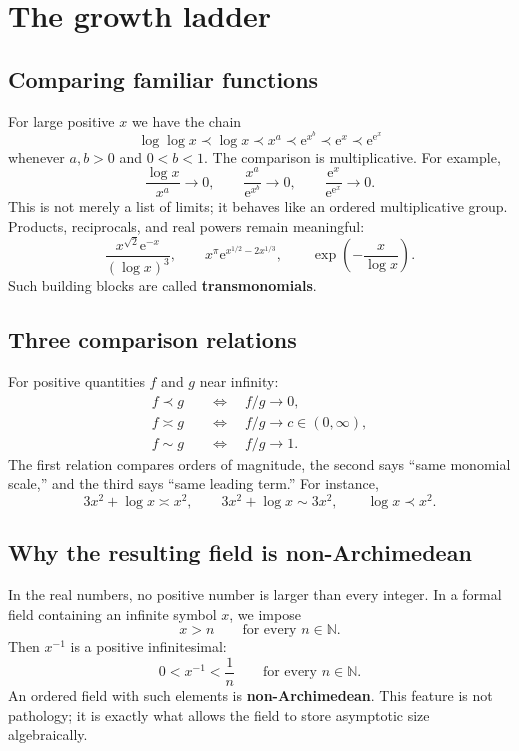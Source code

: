 \documentclass[11pt,openany]{book}
\theoremstyle{plain}
\theoremstyle{definition}
\theoremstyle{remark}
\newcommand{\N}{\mathbb{N}}
\newcommand{\e}{\mathrm{e}}
\newcommand{\defterm}[1]{\textbf{#1}}
\begin{document}
\chapter{The growth ladder}

\section{Comparing familiar functions}
For large positive $x$ we have the chain
\[
  \log\log x\prec\log x\prec x^a\prec \e^{x^b}\prec\e^x\prec\e^{\e^x}
\]
whenever $a,b>0$ and $0<b<1$. The comparison is multiplicative. For example,
\[
  \frac{\log x}{x^a}\to0,
  \qquad
  \frac{x^a}{\e^{x^b}}\to0,
  \qquad
  \frac{\e^x}{\e^{\e^x}}\to0.
\]
This is not merely a list of limits; it behaves like an ordered multiplicative group. Products, reciprocals, and real powers remain meaningful:
\[
  \frac{x^{\sqrt2}\e^{-x}}{(\log x)^3},
  \qquad
  x^\pi\e^{x^{1/2}-2x^{1/3}},
  \qquad
  \exp\!\left(-\frac{x}{\log x}\right).
\]
Such building blocks are called \defterm{transmonomials}.

\section{Three comparison relations}
For positive quantities $f$ and $g$ near infinity:
\begin{align*}
  f\prec g &\quad\Longleftrightarrow\quad f/g\to0,\\
  f\asymp g &\quad\Longleftrightarrow\quad f/g\to c\in(0,\infty),\\
  f\sim g &\quad\Longleftrightarrow\quad f/g\to1.
\end{align*}
The first relation compares orders of magnitude, the second says ``same monomial scale,'' and the third says ``same leading term.'' For instance,
\[
  3x^2+\log x\asymp x^2,
  \qquad
  3x^2+\log x\sim3x^2,
  \qquad
  \log x\prec x^2.
\]

\section{Why the resulting field is non-Archimedean}
In the real numbers, no positive number is larger than every integer. In a formal field containing an infinite symbol $x$, we impose
\[
  x>n\qquad\text{for every }n\in\N.
\]
Then $x^{-1}$ is a positive infinitesimal:
\[
  0<x^{-1}<\frac1n\qquad\text{for every }n\in\N.
\]
An ordered field with such elements is \defterm{non-Archimedean}. This feature is not pathology; it is exactly what allows the field to store asymptotic size algebraically.
\end{document}
